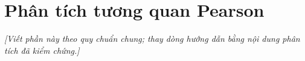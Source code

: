 \section{Phân tích tương quan Pearson}
\noindent\textit{[Viết phần này theo quy chuẩn chung; thay dòng hướng dẫn bằng nội dung phân tích đã kiểm chứng.]}

